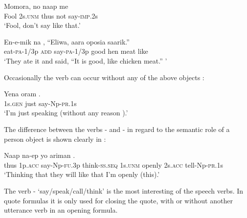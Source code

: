\ea%
\label{ex:3:x319}
\gll Momora, no naap me  \\
Fool 2s.\textsc{unm} thus not say-\textsc{imp}.2s \\
\glt`Fool, don't say like that.'
\z

\ea%
\label{ex:3:x320}
\gll En-e-mik na{\upshape\footnotemark} , ``Eliwa, aara oposia saarik.'' \\
eat-\textsc{pa}-1/3p \textsc{add} say-\textsc{pa}-1/3p good hen meat like\\
\glt`They ate it and said, ``It is good, like chicken meat.'' '
\z


Occasionally the verb can occur without any of the above objects :

\ea%
\label{ex:3:x321}
\gll Yena oram . \\
1s.\textsc{gen} just say-Np-\textsc{pr}.1s \\
\glt`I'm just speaking (without any reason ).'
\z

The difference between the verbs - and - in regard to the semantic role of a person object is shown clearly in :

\ea%
\label{ex:3:x322}
\gll Naap   na-ep yo ariman   .
\\
thus 1p.\textsc{acc} say-Np-\textsc{fu}.3p think-\textsc{ss}.\textsc{seq} 1s.\textsc{unm} openly 2s.\textsc{acc} tell-Np-\textsc{pr}.1s\\
\glt`Thinking that they will  like that  I'm openly  (this).'
\z

The verb - `say/speak/call/think' is the most interesting of the speech verbs. In quote formulas it is only used for closing the quote, with  or without another utterance verb  in an opening formula.

